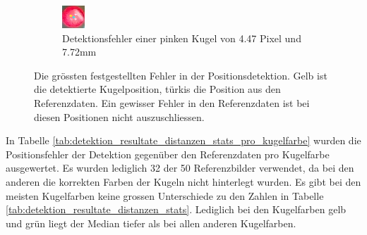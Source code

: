 \begin{figure}[h!]
\begin{subfigure}[t]{0.3\textwidth}
        \includegraphics[width=1.0\linewidth]{../common/04_results/resources/bad_detection_5_7.727108_4.472136.png}
        \caption{Detektionsfehler einer pinken Kugel von 4.47 Pixel und 7.72mm}
        \label{fig:detection_results_bad_detection_2}
    \end{subfigure}
    \caption{
        Die grössten festgestellten Fehler in der Positionsdetektion. Gelb ist die detektierte Kugelposition, türkis die Position aus den Referenzdaten.
        Ein gewisser Fehler in den Referenzdaten ist bei diesen Positionen nicht auszuschliessen.
    }
    \label{fig:detection_results_bad_detections}
\end{figure}

In Tabelle \ref{tab:detektion_resultate_distanzen_stats_pro_kugelfarbe} wurden die Positionsfehler der Detektion
gegenüber den Referenzdaten pro Kugelfarbe ausgewertet.
Es wurden lediglich 32 der 50 Referenzbilder verwendet, da bei den anderen die korrekten Farben der Kugeln nicht hinterlegt wurden.
Es gibt bei den meisten Kugelfarben keine grossen Unterschiede zu den Zahlen in Tabelle \ref{tab:detektion_resultate_distanzen_stats}.
Lediglich bei den Kugelfarben gelb und grün liegt der Median tiefer als bei allen anderen Kugelfarben.

